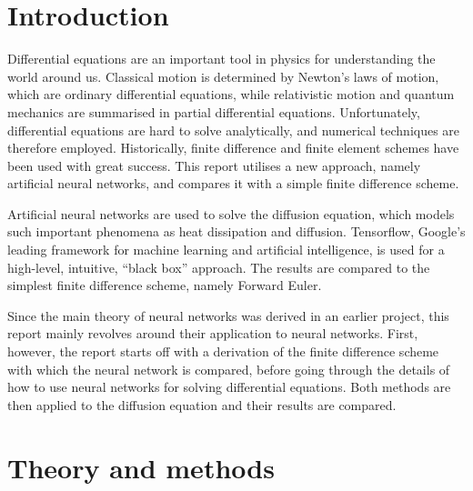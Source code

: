 \documentclass[11pt,british,a4paper]{article}
\numberwithin{equation}{section}
\begin{document}
\clearpage
\section{Introduction}
Differential equations are an important tool in physics for understanding the world around us. Classical motion is determined by Newton's laws of motion, which are ordinary differential equations, while relativistic motion and quantum mechanics are summarised in partial differential equations. Unfortunately, differential equations are hard to solve analytically, and numerical techniques are therefore employed. Historically, finite difference and finite element schemes have been used with great success. This report utilises a new approach, namely artificial neural networks, and compares it with a simple finite difference scheme.

Artificial neural networks are used to solve the diffusion equation, which models such important phenomena as heat dissipation and diffusion. Tensorflow, Google's leading framework for machine learning and artificial intelligence, is used for a high-level, intuitive, ``black box'' approach. The results are compared to the simplest finite difference scheme, namely Forward Euler.

Since the main theory of neural networks was derived in an earlier project, this report mainly revolves around their application to neural networks. First, however, the report starts off with a derivation of the finite difference scheme with which the neural network is compared, before going through the details of how to use neural networks for solving differential equations. Both methods are then applied to the diffusion equation and their results are compared.

\section{Theory and methods}
\end{document}
